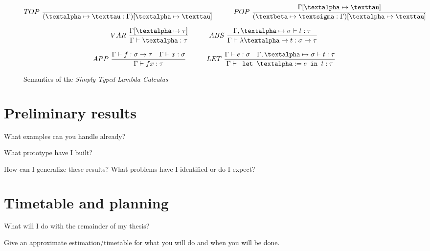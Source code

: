 \documentclass[11pt]{article}
\begin{document}
\begin{figure}[h] 
\hrulefill

\begin{equation*}
  TOP\ \frac{}{(\textalpha \mapsto \texttau : \Gamma) [\textalpha \mapsto \texttau]} 
\quad\quad\quad 
  POP\ \frac{\Gamma[\textalpha \mapsto \texttau]}{(\textbeta \mapsto \textsigma : \Gamma) [ \textalpha \mapsto \texttau ] }
\end{equation*}

\begin{equation*}
  VAR\ \frac{\Gamma[\textalpha \mapsto \tau]}{\Gamma \vdash \textalpha : \tau}
\quad\quad\quad
  ABS\ \frac{\Gamma , \textalpha \mapsto \sigma \vdash t : \tau}{\Gamma \vdash \lambda \textalpha \rightarrow t : \sigma \rightarrow \tau}
\end{equation*}

\begin{equation*}
  APP\ \frac{\Gamma \vdash f : \sigma \rightarrow \tau \quad \Gamma \vdash x : \sigma}{\Gamma \vdash f x : \tau}
\quad\quad\quad 
  LET\ \frac{\Gamma \vdash e : \sigma \quad \Gamma , \textalpha \mapsto \sigma \vdash t : \tau}
            {\Gamma \vdash \texttt{ let } \textalpha := e \texttt{ in } t : \tau }
\end{equation*}

\hrulefill
\caption{Semantics of the \textit{Simply Typed Lambda Calculus}}
\end{figure}


\section{Preliminary results}

What examples can you handle already? \cite{lampropoulos2017generating}

What prototype have I built? \cite{duregaard2013feat, claessen2010quickspec}

How can I generalize these results? What problems have I identified or
do I expect? \cite{yakushev2009generic}

\section{Timetable and planning}

What will I do with the remainder of my thesis? \cite{claessen2015generating}

Give an approximate estimation/timetable for what you will do and when you will be done.

\newpage
{}

\end{document}
